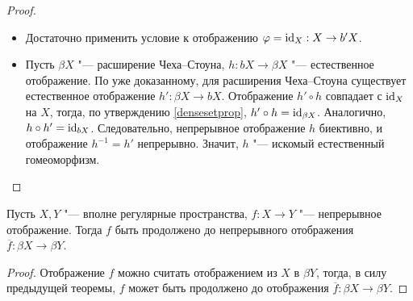 \begin{proof}
\begin{itemize}
        \item{}Достаточно применить условие к отображению $\varphi = \mathrm{id}_X: X \to b'X$.
        
        \item{}Пусть $\beta X$ "--- расширение Чеха--Стоуна, $h: bX\rightarrow \beta X$ "--- естественное отображение. По уже доказанному, для расширения Чеха--Стоуна существует естественное отображение $h': \beta X\rightarrow bX$. Отображение $h'\circ h$ совпадает с $\mathrm{id}_X$ на $X$, тогда, по утверждению \ref{densesetprop}, $h'\circ h = \mathrm{id}_{\beta X}$. Аналогично, $h\circ h' = \mathrm{id}_{bX}$. Следовательно, непрерывное отображение $h$ биективно, и отображение $h^{-1} = h'$ непрерывно. Значит, $h$ "--- искомый естественный гомеоморфизм.\qedhere
    \end{itemize}
\end{proof}

\begin{theorem}
    Пусть $X, Y$ "--- вполне регулярные пространства, $f : X \to Y$ "--- непрерывное отображение. Тогда $f$ быть продолжено до непрерывного отображения $\overline{f}: \beta X \rightarrow \beta Y$.
\end{theorem}

\begin{proof}
    Отображение $f$ можно считать отображением из $X$ в $\beta Y$, тогда, в силу предыдущей теоремы, $f$ может быть продолжено до отображения $\overline{f}: \beta X \rightarrow \beta Y$.
\end{proof}
